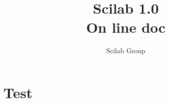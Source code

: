 
             \title{Scilab 1.0 \\ On line doc }
             \author{Scilab Group}
             \textheight=660pt 
             \textwidth=470pt
             \topmargin=-27pt 
             \oddsidemargin=0.7cm
             \evensidemargin=0.7cm
             \marginparwidth=60pt
\def\vector#1{\left( \begin{array}{c} #1  \end{array}\right)}
\def\matrixq#1{\left( \begin{array}{cc} #1  \end{array}\right)}

\makeindex 

\maketitle

\chapter{Test}
 
\printindex
